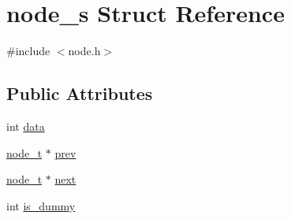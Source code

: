 \hypertarget{structnode__s}{\section{node\-\_\-s Struct Reference}
\label{structnode__s}
}


{\ttfamily \#include $<$node.\-h$>$}

\subsection*{Public Attributes}
\begin{DoxyCompactItemize}
\item 
int \hyperlink{structnode__s_a9eeca3bba8c141ccc40edb205d898c5a}{data}
\item 
\hyperlink{node_8h_a33b99e5345d46cf63926673aa2b9ff83}{node\-\_\-t} $\ast$ \hyperlink{structnode__s_af63f2c2c1d16037022a14eacd1abf713}{prev}
\item 
\hyperlink{node_8h_a33b99e5345d46cf63926673aa2b9ff83}{node\-\_\-t} $\ast$ \hyperlink{structnode__s_a5a6b703d87cda099a7dc7dc1dbcae9d7}{next}
\item 
int \hyperlink{structnode__s_aa299569154c5d785262de31caf489f84}{is\-\_\-dummy}
\end{DoxyCompactItemize}


